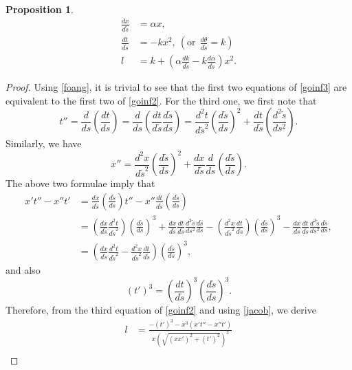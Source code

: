 \documentclass[12pt]{amsart}
\newtheorem{prop}[thm]{\sc Proposition}
\theoremstyle{definition}\newtheorem{exa}[thm]{\sc Example}
\theoremstyle{definition}\newtheorem{de}[thm]{\sc Definition}
\theoremstyle{definition}\newtheorem{rem}[thm]{\sc Remark}
\theoremstyle{definition}\newtheorem{prob}[thm]{\it Problem}
\theoremstyle{definition}\newtheorem{fact}[thm]{\sc Fact}
\theoremstyle{definition}\newtheorem{claim}[thm]{\sc Claim}
\numberwithin{equation}{section}
\begin{document}
\begin{prop}\label{gemeok}
\begin{equation}\label{goinf3}
\begin{split}
\frac{dx}{d\tilde{s}}&=\alpha x,\\  
\frac{dt}{d\tilde{s}}&=-kx^2,\ \left(\textrm{or}\ \ \frac{d\theta}{d\tilde{s}}=k\right)\\
l&=k+\left(\alpha\frac{dk}{d\tilde{s}}-k\frac{d\alpha}{d\tilde{s}}\right)x^2.
\end{split}
\end{equation}
\end{prop}
\begin{proof}
Using \eqref{foang}, it is trivial to see that the first two equations of \eqref{goinf3} are equivalent to the first two of \eqref{goinf2}. 
For the third one, we first note that
\[t''=\frac{d}{ds}\left(\frac{dt}{ds}\right)=\frac{d}{ds}\left(\frac{dt}{d\tilde{s}}\frac{d\tilde{s}}{ds}\right)=\frac{d^2t}{d\tilde{s}^2}\left(\frac{d\tilde{s}}{ds}\right)^{2}+\frac{dt}{d\tilde{s}}\left(\frac{d^2\tilde{s}}{ds^2}\right).\]
Similarly, we have
\[x''=\frac{d^2x}{d\tilde{s}^2}\left(\frac{d\tilde{s}}{ds}\right)^{2}+\frac{dx}{d\tilde{s}}\frac{d}{ds}\left(\frac{d\tilde{s}}{ds}\right).\]
The above two formulae imply that
\begin{equation}
\begin{split}
x't''-x''t'&=\frac{dx}{d\tilde{s}}\left(\frac{d\tilde{s}}{ds}\right)t''-x''\frac{dt}{d\tilde{s}}\left(\frac{d\tilde{s}}{ds}\right)\\
&=\left(\frac{dx}{d\tilde{s}}\frac{d^2t}{d\tilde{s}^2}\right)\left(\frac{d\tilde{s}}{ds}\right)^{3}+\frac{dx}{d\tilde{s}}\frac{dt}{d\tilde{s}}\frac{d^2\tilde{s}}{ds^2}\frac{d\tilde{s}}{ds}-\left(\frac{d^2x}{d\tilde{s}^2}\frac{dt}{d\tilde{s}}\right)\left(\frac{d\tilde{s}}{ds}\right)^{3}-\frac{dx}{d\tilde{s}}\frac{dt}{d\tilde{s}}\frac{d^2\tilde{s}}{ds^2}\frac{d\tilde{s}}{ds},\\
&=\left(\frac{dx}{d\tilde{s}}\frac{d^2t}{d\tilde{s}^2}-\frac{d^2x}{d\tilde{s}^2}\frac{dt}{d\tilde{s}}\right)\left(\frac{d\tilde{s}}{ds}\right)^{3},
\end{split}
\end{equation}
and also
\[(t')^3=\left(\frac{dt}{d\tilde{s}}\right)^3\left(\frac{d\tilde{s}}{ds}\right)^{3}.\]
Therefore, from the third equation of \eqref{goinf2} and using \eqref{jacob}, we derive
\begin{equation}\label{fofol}
\begin{split}
l&=\frac{-(t')^3-x^3(x't''-x''t')}{x(\sqrt{(xx')^2+(t')^2})^3}\\

\end{split}
\end{equation}
\end{proof}
\end{document}

